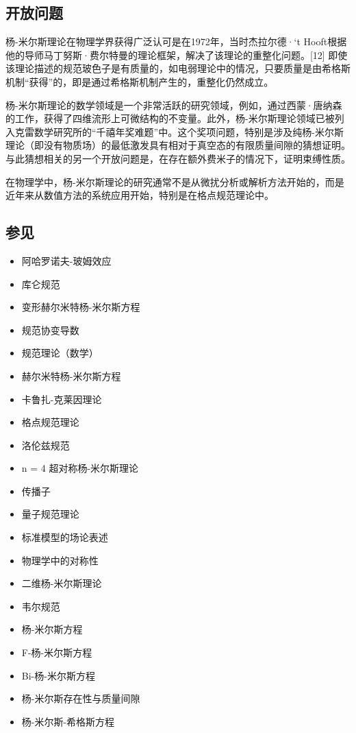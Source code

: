 \subsection{开放问题}
杨-米尔斯理论在物理学界获得广泛认可是在1972年，当时杰拉尔德·‘t Hooft根据他的导师马丁努斯·费尔特曼的理论框架，解决了该理论的重整化问题。[12] 即使该理论描述的规范玻色子是有质量的，如电弱理论中的情况，只要质量是由希格斯机制“获得”的，即是通过希格斯机制产生的，重整化仍然成立。

杨-米尔斯理论的数学领域是一个非常活跃的研究领域，例如，通过西蒙·唐纳森的工作，获得了四维流形上可微结构的不变量。此外，杨-米尔斯理论领域已被列入克雷数学研究所的“千禧年奖难题”中。这个奖项问题，特别是涉及纯杨-米尔斯理论（即没有物质场）的最低激发具有相对于真空态的有限质量间隙的猜想证明。与此猜想相关的另一个开放问题是，在存在额外费米子的情况下，证明束缚性质。

在物理学中，杨-米尔斯理论的研究通常不是从微扰分析或解析方法开始的，而是近年来从数值方法的系统应用开始，特别是在格点规范理论中。
\subsection{参见}
\begin{itemize}
\item 阿哈罗诺夫-玻姆效应
\item 库仑规范
\item 变形赫尔米特杨-米尔斯方程
\item 规范协变导数
\item 规范理论（数学）
\item 赫尔米特杨-米尔斯方程
\item 卡鲁扎-克莱因理论
\item 格点规范理论
\item 洛伦兹规范
\item n = 4 超对称杨-米尔斯理论
\item 传播子
\item 量子规范理论
\item 标准模型的场论表述
\item 物理学中的对称性
\item 二维杨-米尔斯理论
\item 韦尔规范
\item 杨-米尔斯方程
\item F-杨-米尔斯方程
\item Bi-杨-米尔斯方程
\item 杨-米尔斯存在性与质量间隙
\item 杨-米尔斯-希格斯方程
\end{itemize}
